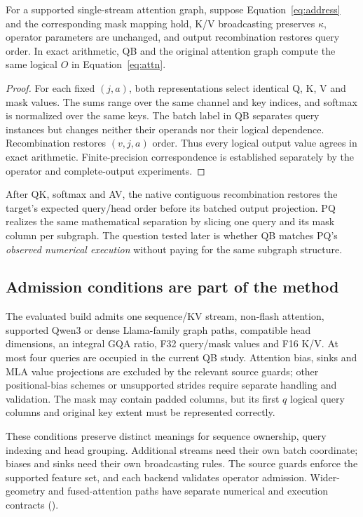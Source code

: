 \begin{proposition}
For a supported single-stream attention graph, suppose Equation~\eqref{eq:address} and the corresponding mask mapping hold, K/V broadcasting preserves $\kappa$, operator parameters are unchanged, and output recombination restores query order. In exact arithmetic, QB and the original attention graph compute the same logical $O$ in Equation~\eqref{eq:attn}.
\end{proposition}
\begin{proof}
For each fixed $(j,a)$, both representations select identical Q, K, V and mask values. The sums range over the same channel and key indices, and softmax is normalized over the same keys. The batch label in QB separates query instances but changes neither their operands nor their logical dependence. Recombination restores $(v,j,a)$ order. Thus every logical output value agrees in exact arithmetic. Finite-precision correspondence is established separately by the operator and complete-output experiments.
\end{proof}

After QK, softmax and AV, the native contiguous recombination restores the target's expected query/head order before its batched output projection. PQ realizes the same mathematical separation by slicing one query and its mask column per subgraph. The question tested later is whether QB matches PQ's \emph{observed numerical execution} without paying for the same subgraph structure.

\subsection{Admission conditions are part of the method}
The evaluated build admits one sequence/KV stream, non-flash attention, supported Qwen3 or dense Llama-family graph paths, compatible head dimensions, an integral GQA ratio, F32 query/mask values and F16 K/V. At most four queries are occupied in the current QB study. Attention bias, sinks and MLA value projections are excluded by the relevant source guards; other positional-bias schemes or unsupported strides require separate handling and validation. The mask may contain padded columns, but its first $q$ logical query columns and original key extent must be represented correctly.

These conditions preserve distinct meanings for sequence ownership, query indexing and head grouping. Additional streams need their own batch coordinate; biases and sinks need their own broadcasting rules. The source guards enforce the supported feature set, and each backend validates operator admission. Wider-geometry and fused-attention paths have separate numerical and execution contracts ().

